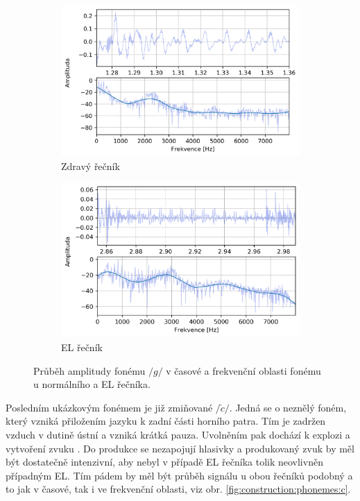 \begin{figure}[htpb]
  \centering
  \begin{subfigure}[b]{0.45\textwidth}
    \includegraphics[width=\textwidth]{./ch5-construction/img/signal-normal_g.png}
    \caption{Zdravý řečník}
    \label{fig:construction:phonemes:g:normal}
  \end{subfigure}
  \begin{subfigure}[b]{0.45\textwidth}
    \includegraphics[width=\textwidth]{./ch5-construction/img/signal-el_g.png}
    \caption{EL řečník}
    \label{fig:construction:phonemes:g:el}
  \end{subfigure}
  \caption{Průběh amplitudy fonému $/g/$ v časové a frekvenční oblasti fonému u normálního a EL řečníka.}
  \label{fig:construction:phonemes:g}
\end{figure}

Posledním ukázkovým fonémem je již zmiňované $/\check{c}/$.
Jedná se o neznělý foném, který vzniká přiložením jazyku k zadní části horního patra.
Tím je zadržen vzduch v dutině ústní a vzniká krátká pauza.
Uvolněním pak dochází k explozi a vytvoření zvuku \cite{Psutka2006}.
Do produkce se nezapojují hlasivky a produkovaný zvuk by měl být dostatečně intenzivní, aby nebyl v případě EL řečníka tolik neovlivněn případným EL.
Tím pádem by měl být průběh signálu u obou řečníků podobný a to jak v časové, tak i ve frekvenční oblasti, viz obr. \ref{fig:construction:phonemes:c}.

